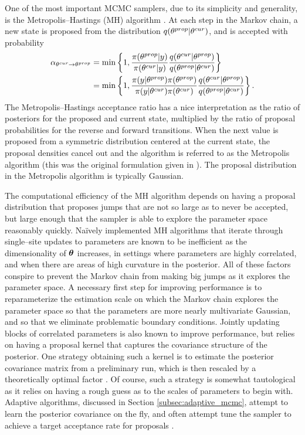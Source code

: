 One of the most important MCMC samplers, due to its simplicity and generality, is the Metropolis--Hastings (MH) algorithm \cite{hastings1970monte,metropolis1953equation}. At each step in the Markov chain, a new state is proposed from the distribution $ q(\theta^{prop}|\theta^{cur}) $, and is accepted with probability
\begin{align}
\label{eqn:metropolis_hastings_1}
\alpha_{\theta^{cur}\rightarrow\theta^{prop}} &= \min\left \lbrace 1, \frac{\pi(\theta^{prop}|y)}{\pi(\theta^{cur}|y)}\frac{q(\theta^{cur}|\theta^{prop})}{q(\theta^{prop}|\theta^{cur})}\right \rbrace \\
\label{eqn:metropolis_hastings_2}
&= \min\left \lbrace 1, \frac{\pi(y|\theta^{prop})\pi(\theta^{prop})}{\pi(y|\theta^{cur})\pi(\theta^{cur})}\frac{q(\theta^{cur}|\theta^{prop})}{q(\theta^{prop}|\theta^{cur})}\right \rbrace.
\end{align}
The Metropolis--Hastings acceptance ratio has a nice interpretation as the ratio of posteriors for the proposed and current state, multiplied by the ratio of proposal probabilities for the reverse and forward transitions. When the next value is proposed from a symmetric distribution centered at the current state, the proposal densities cancel out and the algorithm is referred to as the Metropolis algorithm (this was the original formulation given in \cite{metropolis1953equation}). The proposal distribution in the Metropolis algorithm is typically Gaussian.

The computational efficiency of the MH algorithm depends on having a proposal distribution that proposes jumps that are not so large as to never be accepted, but large enough that the sampler is able to explore the parameter space reasonably quickly. Na\"{i}vely implemented MH algorithms that iterate through single--site updates to parameters are known to be inefficient as the dimensionality of $ \boldsymbol{\theta} $ increases, in settings where parameters are highly correlated, and when there are areas of high curvature in the posterior. All of these factors conspire to prevent the Markov chain from making big jumps as it explores the parameter space. A necessary first step for improving performance is to reparameterize the estimation scale on which the Markov chain explores the parameter space so that the parameters are more nearly multivariate Gaussian, and so that we eliminate problematic boundary conditions. Jointly updating blocks of correlated parameters is also known to improve performance, but relies on having a proposal kernel that captures the covariance structure of the posterior. One strategy obtaining such a kernel is to estimate the posterior covariance matrix from a preliminary run, which is then rescaled by a theoretically optimal factor  \cite{gelman1997weak,roberts2001optimal,roberts2009examples}. Of course, such a strategy is somewhat tautological as it relies on having a rough guess as to the scales of parameters to begin with. Adaptive algorithms, discussed in Section \ref{subsec:adaptive_mcmc}, attempt to learn the posterior covariance on the fly, and often attempt tune the sampler to achieve a target acceptance rate for proposals  \cite{andrieu2008tutorial,roberts2009examples,liang2011advanced}. 

